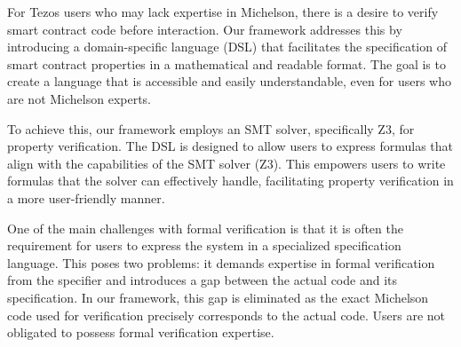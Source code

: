 \documentclass[a4paper,UKenglish,cleveref, autoref, thm-restate]{lipics-v2021}
\begin{document}
For Tezos users who may lack expertise in Michelson, there is a desire to verify smart contract code before interaction. Our framework addresses this by introducing a domain-specific language (DSL) that facilitates the specification of smart contract properties in a mathematical and readable format. The goal is to create a language that is accessible and easily understandable, even for users who are not Michelson experts.

To achieve this, our framework employs an SMT solver, specifically Z3, for property verification. The DSL is designed to allow users to express formulas that align with the capabilities of the SMT solver (Z3). This empowers users to write formulas that the solver can effectively handle, facilitating property verification in a more user-friendly manner.

One of the main challenges with formal verification is that it is often the requirement for users to express the system in a specialized specification language. This poses two problems: it demands expertise in formal verification from the specifier and introduces a gap between the actual code and its specification. In our framework, this gap is eliminated as the exact Michelson code used for verification precisely corresponds to the actual code.  Users are not obligated to possess formal verification expertise. 
\end{document}
